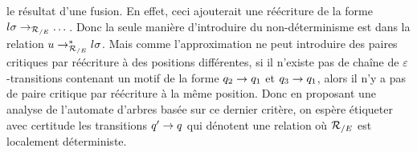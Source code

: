 \begin{itemize}
   le résultat d'une fusion. En effet, ceci ajouterait une réécriture de la forme $l\sigma \rightarrow_{{\mathcal R_{/E}}} \dots$.
   Donc la seule manière d'introduire du non-déterminisme est dans la relation $u \rightarrow_{{\mathcal R_{/E}}}^* l\sigma$.
   Mais comme l'approximation ne peut introduire des paires critiques par réécriture à des positions 
   différentes, si il n'existe pas de chaîne de $\varepsilon$-transitions contenant un motif de la
   forme $q_2 \rightarrow q_1$ et $q_3 \rightarrow q_1$, alors il n'y a pas de paire critique par réécriture à la même position.
   Donc en proposant une analyse de l'automate d'arbres basée sur ce dernier critère, on espère
   étiqueter avec certitude les transitions $q' \rightarrow q$ qui dénotent une relation où ${\mathcal R_{/E}}$ est localement déterministe.
 \end{itemize}



%



